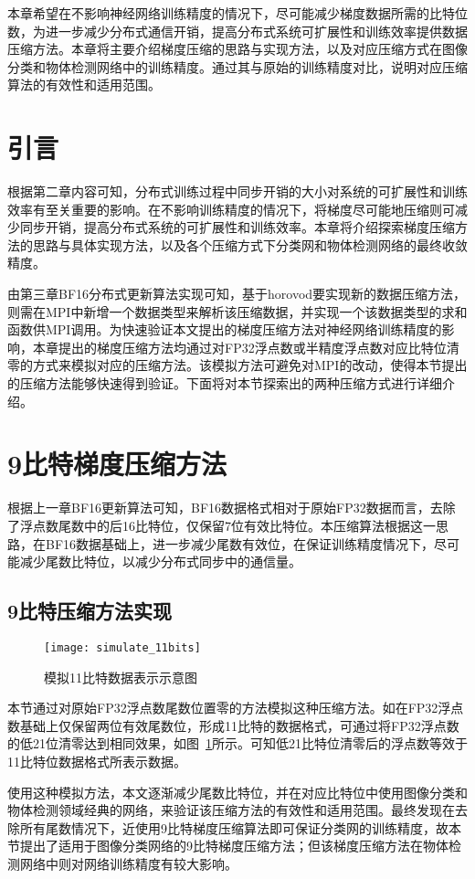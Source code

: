 本章希望在不影响神经网络训练精度的情况下，尽可能减少梯度数据所需的比特位数，为进一步减少分布式通信开销，提高分布式系统可扩展性和训练效率提供数据压缩方法。本章将主要介绍梯度压缩的思路与实现方法，以及对应压缩方式在图像分类和物体检测网络中的训练精度。通过其与原始的训练精度对比，说明对应压缩算法的有效性和适用范围。
\section{引言}
根据第二章内容可知，分布式训练过程中同步开销的大小对系统的可扩展性和训练效率有至关重要的影响。在不影响训练精度的情况下，将梯度尽可能地压缩则可减少同步开销，提高分布式系统的可扩展性和训练效率。本章将介绍探索梯度压缩方法的思路与具体实现方法，以及各个压缩方式下分类网和物体检测网络的最终收敛精度。

由第三章BF16分布式更新算法实现可知，基于horovod要实现新的数据压缩方法，则需在MPI中新增一个数据类型来解析该压缩数据，并实现一个该数据类型的求和函数供MPI调用。为快速验证本文提出的梯度压缩方法对神经网络训练精度的影响，本章提出的梯度压缩方法均通过对FP32浮点数或半精度浮点数对应比特位清零的方式来模拟对应的压缩方法。该模拟方法可避免对MPI的改动，使得本节提出的压缩方法能够快速得到验证。下面将对本节探索出的两种压缩方式进行详细介绍。
\section{9比特梯度压缩方法}
根据上一章BF16更新算法可知，BF16数据格式相对于原始FP32数据而言，去除了浮点数尾数中的后16比特位，仅保留7位有效比特位。本压缩算法根据这一思路，在BF16数据基础上，进一步减少尾数有效位，在保证训练精度情况下，尽可能减少尾数比特位，以减少分布式同步中的通信量。

\subsection{9比特压缩方法实现}
\begin{figure}[htp]
\centering
\texttt{[image: simulate\_11bits]}
\caption{模拟11比特数据表示示意图}
\label{fig:simulate_11bits}
\end{figure}
本节通过对原始FP32浮点数尾数位置零的方法模拟这种压缩方法。如在FP32浮点数基础上仅保留两位有效尾数位，形成11比特的数据格式，可通过将FP32浮点数的低21位清零达到相同效果，如图~\ref{fig:simulate_11bits}所示。可知低21比特位清零后的浮点数等效于11比特位数据格式所表示数据。

使用这种模拟方法，本文逐渐减少尾数比特位，并在对应比特位中使用图像分类和物体检测领域经典的网络，来验证该压缩方法的有效性和适用范围。最终发现在去除所有尾数情况下，近使用9比特梯度压缩算法即可保证分类网的训练精度，故本节提出了适用于图像分类网络的9比特梯度压缩方法；但该梯度压缩方法在物体检测网络中则对网络训练精度有较大影响。

